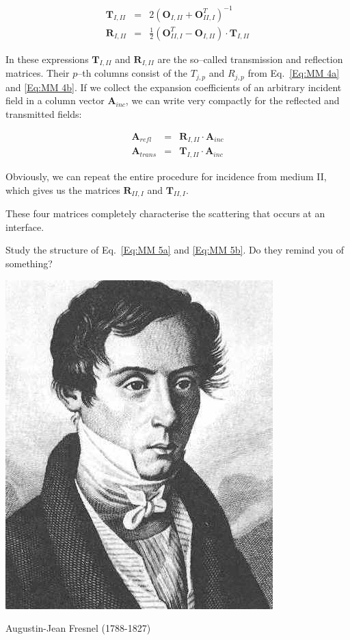 \begin{eqnarray}
\mathbf{T}_{I,II} & = & 2\left( \mathbf{O}_{I,II}+\mathbf{O}^{T}_{II,I}\right) ^{-1}\label{Eq:MM 5a} \\
\mathbf{R}_{I,II} & = & \frac{1}{2}\left( \mathbf{O}^{T}_{II,I}-\mathbf{O}_{I,II}\right) \cdot \mathbf{T}_{I,II}\label{Eq:MM 5b} 
\end{eqnarray}

In these expressions $\mathbf{T}_{I,II}$ and $\mathbf{R}_{I,II}$ are the so--called transmission and reflection matrices. Their \( p \)--th columns consist of the $T_{j,p}$ and $R_{j,p}$ from Eq.~\ref{Eq:MM 4a} and \ref{Eq:MM 4b}. If we collect the expansion coefficients of an arbitrary incident field in a column vector $\mathbf{A}_{inc}$, we can write very compactly for the reflected and transmitted fields: 

\begin{eqnarray}
\mathbf{A}_{refl} & = & \mathbf{R}_{I,II}\cdot \mathbf{A}_{inc}\label{Eq:R matrix} \\
\mathbf{A}_{trans} & = & \mathbf{T}_{I,II}\cdot \mathbf{A}_{inc}\label{Eq:T matrix} 
\end{eqnarray}

Obviously, we can repeat the entire procedure for incidence from medium II, which gives us the matrices $\mathbf{R}_{II,I}$ and $\mathbf{T}_{II,I}$.

These four matrices completely characterise the scattering that occurs at an interface.

\begin{cue}
Study the structure of Eq.~\ref{Eq:MM 5a} and \ref{Eq:MM 5b}. Do they remind you of something?  
\end{cue}

\begin{marginfigure}[0.0cm]
  \includegraphics{numeric/figures/a_fresnel}
  \caption{Augustin-Jean Fresnel (1788-1827)}
\end{marginfigure}

